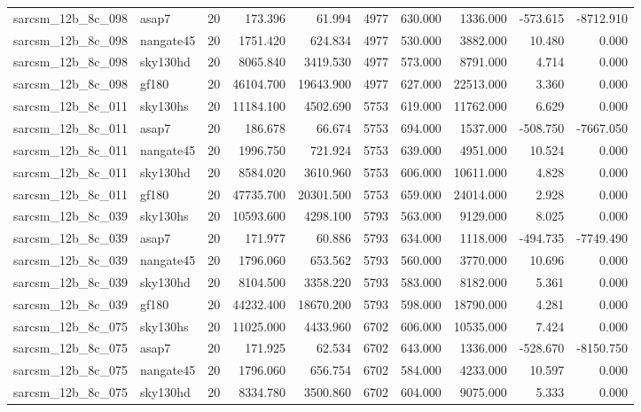 \documentclass{article}
\begin{document}
\begin{longtable}{llrrrrrrrr}
sarcsm\_12b\_8c\_098 & asap7 & 20 & 173.396 & 61.994 & 4977 & 630.000 & 1336.000 & -573.615 & -8712.910 \\
sarcsm\_12b\_8c\_098 & nangate45 & 20 & 1751.420 & 624.834 & 4977 & 530.000 & 3882.000 & 10.480 & 0.000 \\
sarcsm\_12b\_8c\_098 & sky130hd & 20 & 8065.840 & 3419.530 & 4977 & 573.000 & 8791.000 & 4.714 & 0.000 \\
sarcsm\_12b\_8c\_098 & gf180 & 20 & 46104.700 & 19643.900 & 4977 & 627.000 & 22513.000 & 3.360 & 0.000 \\
sarcsm\_12b\_8c\_011 & sky130hs & 20 & 11184.100 & 4502.690 & 5753 & 619.000 & 11762.000 & 6.629 & 0.000 \\
sarcsm\_12b\_8c\_011 & asap7 & 20 & 186.678 & 66.674 & 5753 & 694.000 & 1537.000 & -508.750 & -7667.050 \\
sarcsm\_12b\_8c\_011 & nangate45 & 20 & 1996.750 & 721.924 & 5753 & 639.000 & 4951.000 & 10.524 & 0.000 \\
sarcsm\_12b\_8c\_011 & sky130hd & 20 & 8584.020 & 3610.960 & 5753 & 606.000 & 10611.000 & 4.828 & 0.000 \\
sarcsm\_12b\_8c\_011 & gf180 & 20 & 47735.700 & 20301.500 & 5753 & 659.000 & 24014.000 & 2.928 & 0.000 \\
sarcsm\_12b\_8c\_039 & sky130hs & 20 & 10593.600 & 4298.100 & 5793 & 563.000 & 9129.000 & 8.025 & 0.000 \\
sarcsm\_12b\_8c\_039 & asap7 & 20 & 171.977 & 60.886 & 5793 & 634.000 & 1118.000 & -494.735 & -7749.490 \\
sarcsm\_12b\_8c\_039 & nangate45 & 20 & 1796.060 & 653.562 & 5793 & 560.000 & 3770.000 & 10.696 & 0.000 \\
sarcsm\_12b\_8c\_039 & sky130hd & 20 & 8104.500 & 3358.220 & 5793 & 583.000 & 8182.000 & 5.361 & 0.000 \\
sarcsm\_12b\_8c\_039 & gf180 & 20 & 44232.400 & 18670.200 & 5793 & 598.000 & 18790.000 & 4.281 & 0.000 \\
sarcsm\_12b\_8c\_075 & sky130hs & 20 & 11025.000 & 4433.960 & 6702 & 606.000 & 10535.000 & 7.424 & 0.000 \\
sarcsm\_12b\_8c\_075 & asap7 & 20 & 171.925 & 62.534 & 6702 & 643.000 & 1336.000 & -528.670 & -8150.750 \\
sarcsm\_12b\_8c\_075 & nangate45 & 20 & 1796.060 & 656.754 & 6702 & 584.000 & 4233.000 & 10.597 & 0.000 \\
sarcsm\_12b\_8c\_075 & sky130hd & 20 & 8334.780 & 3500.860 & 6702 & 604.000 & 9075.000 & 5.333 & 0.000 \\

\end{longtable}
\end{document}
